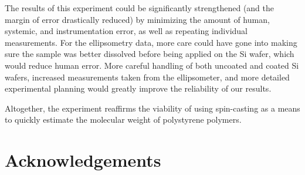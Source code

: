 \documentclass[twocolumn]{article}
\begin{document}
            The results of this experiment could be significantly strengthened (and the margin of error drastically reduced) by minimizing the amount of human, systemic, and instrumentation error, as well as repeating individual measurements. For the ellipsometry data, more care could have gone into making sure the sample was better dissolved before being applied on the Si wafer, which would reduce human error. More careful handling of both uncoated and coated Si wafers, increased measurements taken from the ellipsometer, and more detailed experimental planning would greatly improve the reliability of our results.
            
            Altogether, the experiment reaffirms the viability of using spin-casting as a means to quickly estimate the molecular weight of polystyrene polymers.
        \section{Acknowledgements}
        \printbibliography
\end{document}
